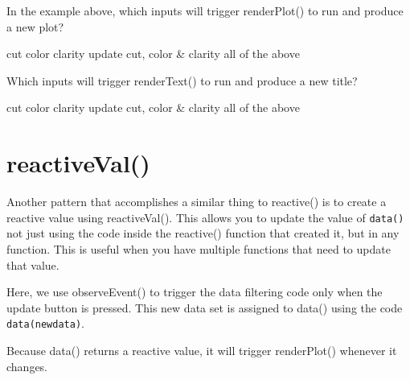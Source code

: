 \documentclass[
]{book}
\begin{document}
In the example above, which inputs will trigger renderPlot() to run and produce a new plot?

cut color clarity update cut, color \& clarity all of the above

Which inputs will trigger renderText() to run and produce a new title?

cut color clarity update cut, color \& clarity all of the above

\hypertarget{reactiveval}{%
\section{reactiveVal()}\label{reactiveval}}

Another pattern that accomplishes a similar thing to reactive() is to create a reactive value using reactiveVal(). This allows you to update the value of \texttt{data()} not just using the code inside the reactive() function that created it, but in any function. This is useful when you have multiple functions that need to update that value.

Here, we use observeEvent() to trigger the data filtering code only when the update button is pressed. This new data set is assigned to data() using the code \texttt{data(newdata)}.

Because data() returns a reactive value, it will trigger renderPlot() whenever it changes.
\end{document}
